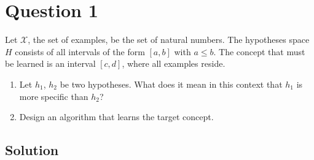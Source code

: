 
\section*{Question 1}

Let $\mathcal{X}$, the set of examples, be the set of natural numbers.
The hypotheses space $H$ consists of all intervals of the form $[a,b]$ with $a \leq b$.
The concept that must be learned is an interval $[c,d]$, where all examples reside.

\begin{enumerate}[label=(\alph*)]
\item Let $h_1$, $h_2$ be two hypotheses.
What does it mean in this context that $h_1$ is more specific than $h_2$?
\item Design an algorithm that learns the target concept.
\end{enumerate}

\subsection*{Solution}

